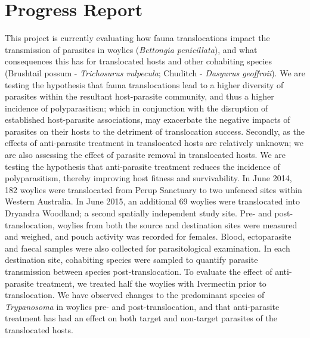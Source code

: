 \documentclass[version=last, paper=a4, DIV=18, usenames, dvipsnames]{scrartcl}
\begin{document}
%

%




\section*{Progress Report}
This project is currently evaluating how fauna translocations impact the
transmission of parasites in woylies (\emph{Bettongia penicillata}), and
what consequences this has for translocated hosts and other cohabiting
species (Brushtail possum - \emph{Trichosurus vulpecula}; Chuditch -
\emph{Dasyurus geoffroii}). We are testing the hypothesis that fauna
translocations lead to a higher diversity of parasites within the
resultant host-parasite community, and thus a higher incidence of
polyparasitism; which in conjunction with the disruption of established
host-parasite associations, may exacerbate the negative impacts of
parasites on their hosts to the detriment of translocation success.
Secondly, as the effects of anti-parasite treatment in translocated
hosts are relatively unknown; we are also assessing the effect of
parasite removal in translocated hosts. We are testing the hypothesis
that anti-parasite treatment reduces the incidence of polyparasitism,
thereby improving host fitness and survivability. In June 2014, 182
woylies were translocated from Perup Sanctuary to two unfenced sites
within Western Australia. In June 2015, an additional 69 woylies were
translocated into Dryandra Woodland; a second spatially independent
study site. Pre- and post-translocation, woylies from both the source
and destination sites were measured and weighed, and pouch activity was
recorded for females. Blood, ectoparasite and faecal samples were also
collected for parasitological examination. In each destination site,
cohabiting species were sampled to quantify parasite transmission
between species post-translocation. To evaluate the effect of
anti-parasite treatment, we treated half the woylies with Ivermectin
prior to translocation. We have observed changes to the predominant
species of \emph{Trypanosoma} in woylies pre- and post-translocation,
and that anti-parasite treatment has had an effect on both target and
non-target parasites of the translocated hosts.




\clearpage
\end{document}
